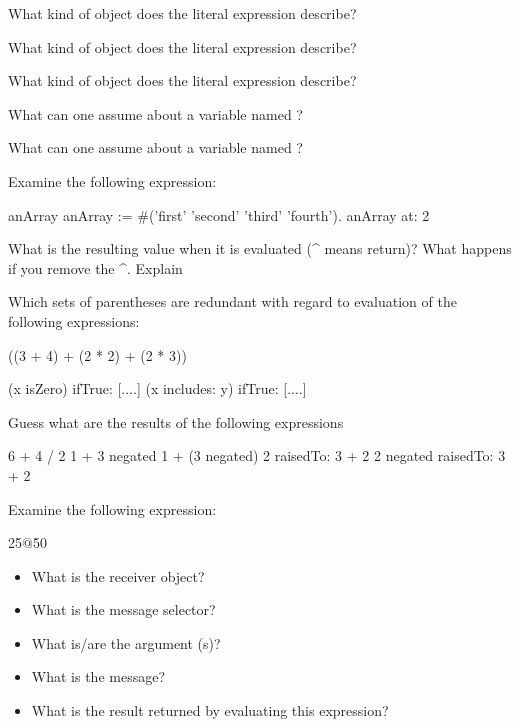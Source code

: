 \exercise What kind of object does the literal expression  describe?

\exercise What kind of object does the literal expression  describe?

\exercise What kind of object does the literal expression  describe?

\exercise What can one assume about a variable named ?

\exercise What can one assume about a variable named ?

\exercise Examine the following expression:

\begin{scode}
\stBar anArray \stBar
anArray := \#('first' 'second' 'third' 'fourth').
anArray at: 2
\end{scode}

What is the resulting value when it is evaluated (\^{ } means return)?
What happens if you remove the \^{ }. Explain

\exercise Which sets of parentheses are redundant with regard to
evaluation of the following expressions:

\begin{scode}
((3 + 4) + (2 * 2) + (2 * 3))

(x isZero)
   ifTrue: [....]
(x includes: y)
   ifTrue: [....]
\end{scode}

\exercise Guess what are the results of the following expressions

\begin{scode}
6 + 4 / 2
1 + 3 negated
1 + (3 negated)
2 raisedTo: 3 + 2
2 negated raisedTo: 3 + 2
\end{scode}

\exercise Examine the following expression:
\begin{scode}
25@50
\end{scode}

\begin{itemize}
\item What is the receiver object?
\item What is the message selector?
\item What is/are the argument (s)?
\item What is the message?
\item What is the result returned by evaluating this expression?
\end{itemize}


